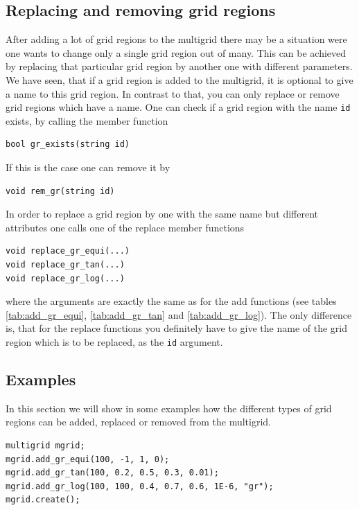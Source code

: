 \subsection{Replacing and removing grid regions}\label{subsec:grid_region_replace_remove}
After adding a lot of grid regions to the multigrid there may be a situation were one wants to change only a single grid region out of many. This can be achieved by replacing that particular grid region by another one with different parameters.
We have seen, that if a grid region is added to the multigrid, it is optional to give a name to this grid region. In contrast to that, you can only replace or remove grid regions which have a name. One can check if a grid region with the name \texttt{id} exists, by calling the member function
\begin{lstlisting}
bool gr_exists(string id)
\end{lstlisting}
If this is the case one can remove it by
\begin{lstlisting}
void rem_gr(string id)
\end{lstlisting}
In order to replace a grid region by one with the same name but different attributes one calls one of the replace member functions
\begin{lstlisting}
void replace_gr_equi(...)
void replace_gr_tan(...)
void replace_gr_log(...)
\end{lstlisting}
where the arguments are exactly the same as for the add functions (see tables \ref{tab:add_gr_equi}, \ref{tab:add_gr_tan} and \ref{tab:add_gr_log}). The only difference is, that for the replace functions you definitely have to give the name of the grid region which is to be replaced, as the \texttt{id} argument.

\subsection{Examples}\label{subsec:grid_region_examples}

In this section we will show in some examples how the different types of grid regions can be added, replaced or removed from the multigrid. 

\begin{lstlisting}[caption={Example for adding grid regions},label={lst:add_gr}]
multigrid mgrid;
mgrid.add_gr_equi(100, -1, 1, 0);
mgrid.add_gr_tan(100, 0.2, 0.5, 0.3, 0.01);
mgrid.add_gr_log(100, 100, 0.4, 0.7, 0.6, 1E-6, "gr");
mgrid.create();
\end{lstlisting}

